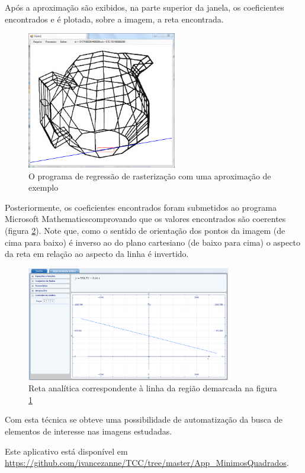 	Após a aproximação são exibidos, na parte superior da janela, os coeficientes encontrados e é plotada, sobre a imagem, a reta encontrada.
	
	\begin{figure}[!htb]
		\centering
		\includegraphics[height=6cm]{imagens/printAppMinimosQuadrados.png}
		\caption{O programa de regressão de rasterização com uma aproximação de exemplo}
		\label{figMinQuadInterface}
	\end{figure}

	Posteriormente, os coeficientes encontrados foram submetidos ao programa Microsoft Mathematics\textregistered  comprovando que os valores encontrados são coerentes (figura \ref{mathematics}). Note que, como o sentido de orientação dos pontos da imagem (de cima para baixo) é inverso ao do plano cartesiano (de baixo para cima) o aspecto da reta em relação ao aspecto da linha é invertido.
	
	\begin{figure}[!htb]
		\centering
		\includegraphics[height=5cm]{imagens/mathematics1.png}
		\caption{Reta analítica correspondente à linha da região demarcada na figura \ref{figMinQuadInterface}}
		\label{mathematics}
	\end{figure}
	
	Com esta técnica se obteve uma possibilidade de automatização da busca de elementos de interesse nas imagens estudadas.
	
	Este aplicativo está disponível em \url{https://github.com/ivancezanne/TCC/tree/master/App_MinimosQuadrados}.
	
